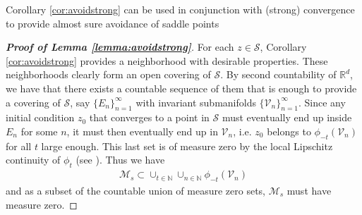 \documentclass[reqno]{amsart}
\theoremstyle{plain}
\theoremstyle{definition}
\theoremstyle{remark}
\begin{document}
Corollary \ref{cor:avoidstrong} can be used in conjunction with (strong) convergence to provide almost sure avoidance of saddle points

\begin{proof}[\textbf{Proof of Lemma \ref{lemma:avoidstrong}}]
    For each $z \in \mathcal{S}$, Corollary \ref{cor:avoidstrong} provides a neighborhood with desirable properties. These neighborhoods clearly form an open covering of $\mathcal{S}$. By second countability of $\mathbb{R}^d$, we have that there exists a countable sequence of them that is enough to provide a covering of $\mathcal{S}$, say $\{E_n\}_{n=1}^\infty$ with invariant submanifolds $\{\mathcal{V}_n\}_{n=1}^\infty$. Since any initial condition $z_0$ that converges to a point in $\mathcal{S}$ must eventually end up inside $E_n$ for some $n$, it must then eventually end up in $\mathcal{V}_n$, i.e. $z_0$ belongs to $\phi_{-t}\left( \mathcal{V}_n \right)$ for all $t$ large enough. This last set is of measure zero by the local Lipschitz continuity of $\phi_{t}$ (see \cite[Theorem $2.8$]{teschl2012ordinary}). 
	Thus we have
	\begin{align}
	\mathcal{M}_s \subset \cup_{t\in\mathbb{N}} \cup_{n\in\mathbb{N}} \phi_{-t}\left( \mathcal{V}_n \right)
	\end{align}
	and as a subset of the countable union of measure zero sets, $\mathcal{M}_s$ must have measure zero. 
\end{proof} 
	





\normalsize


\end{document}
